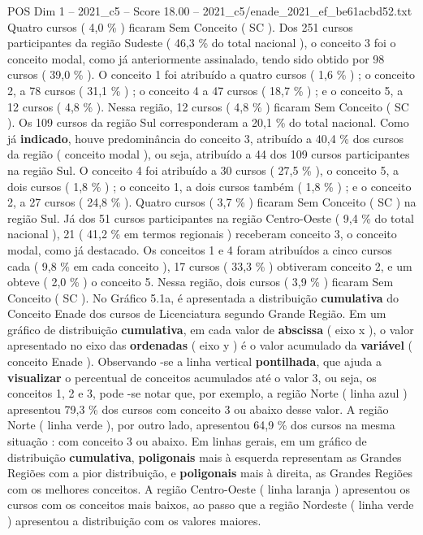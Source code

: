 \begin{textsample}{POS Dim 1 – 2021\_c5 – Score 18.00 – 2021\_c5/enade\_2021\_ef\_be61acbd52.txt}
Quatro cursos ( 4,0 \% ) ficaram Sem Conceito ( SC ).
Dos 251 cursos participantes da região Sudeste ( 46,3 \% do total nacional ), o conceito 3 foi o conceito modal, como já anteriormente assinalado, tendo sido obtido por 98 cursos ( 39,0 \% ).
O conceito 1 foi atribuído a quatro cursos ( 1,6 \% ) ; o conceito 2, a 78 cursos ( 31,1 \% ) ; o conceito 4 a 47 cursos ( 18,7 \% ) ; e o conceito 5, a 12 cursos ( 4,8 \% ).
Nessa região, 12 cursos ( 4,8 \% ) ficaram Sem Conceito ( SC ).
Os 109 cursos da região Sul corresponderam a 20,1 \% do total nacional.
Como já \textbf{indicado}, houve predominância do conceito 3, atribuído a 40,4 \% dos cursos da região ( conceito modal ), ou seja, atribuído a 44 dos 109 cursos participantes na região Sul.
O conceito 4 foi atribuído a 30 cursos ( 27,5 \% ), o conceito 5, a dois cursos ( 1,8 \% ) ; o conceito 1, a dois cursos também ( 1,8 \% ) ; e o conceito 2, a 27 cursos ( 24,8 \% ).
Quatro cursos ( 3,7 \% ) ficaram Sem Conceito ( SC ) na região Sul.
Já dos 51 cursos participantes na região Centro-Oeste ( 9,4 \% do total nacional ), 21 ( 41,2 \% em termos regionais ) receberam conceito 3, o conceito modal, como já destacado.
Os conceitos 1 e 4 foram atribuídos a cinco cursos cada ( 9,8 \% em cada conceito ), 17 cursos ( 33,3 \% ) obtiveram conceito 2, e um obteve ( 2,0 \% ) o conceito 5.
Nessa região, dois cursos ( 3,9 \% ) ficaram Sem Conceito ( SC ).
No Gráfico 5.1a, é apresentada a distribuição \textbf{cumulativa} do Conceito Enade dos cursos de Licenciatura segundo Grande Região.
Em um gráfico de distribuição \textbf{cumulativa}, em cada valor de \textbf{abscissa} ( eixo x ), o valor apresentado no eixo das \textbf{ordenadas} ( eixo y ) é o valor acumulado da \textbf{variável} ( conceito Enade ).
Observando -se a linha vertical \textbf{pontilhada}, que ajuda a \textbf{visualizar} o percentual de conceitos acumulados até o valor 3, ou seja, os conceitos 1, 2 e 3, pode -se notar que, por exemplo, a região Norte ( linha azul ) apresentou 79,3 \% dos cursos com conceito 3 ou abaixo desse valor.
A região Norte ( linha verde ), por outro lado, apresentou 64,9 \% dos cursos na mesma situação : com conceito 3 ou abaixo.
Em linhas gerais, em um gráfico de distribuição \textbf{cumulativa}, \textbf{poligonais} mais à esquerda representam as Grandes Regiões com a pior distribuição, e \textbf{poligonais} mais à direita, as Grandes Regiões com os melhores conceitos.
A região Centro-Oeste ( linha laranja ) apresentou os cursos com os conceitos mais baixos, ao passo que a região Nordeste ( linha verde ) apresentou a distribuição com os valores maiores.

\end{textsample}
